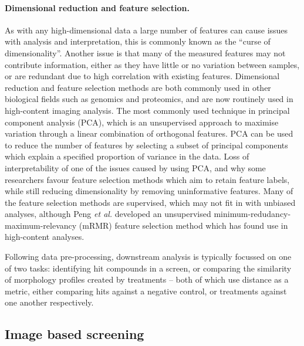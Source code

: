 \documentclass[a4paper,11pt,twoside,openright]{scrbook}
\begin{document}
\paragraph{Dimensional reduction and feature selection.}
As with any high-dimensional data a large number of features can cause issues with analysis and interpretation, this is commonly known as the ``curse of dimensionality''.
Another issue is that many of the measured features may not contribute information, either as they have little or no variation between samples, or are redundant due to high correlation with existing features.
Dimensional reduction and feature selection methods are both commonly used in other biological fields such as genomics and proteomics, and are now routinely used in high-content imaging analysis.
The most commonly used technique in principal component analysis (PCA), which is an unsupervised approach to maximise variation through a linear combination of orthogonal features.
PCA can be used to reduce the number of features by selecting a subset of principal components which explain a specified proportion of variance in the data.
Loss of interpretability of one of the issues caused by using PCA, and why some researchers favour feature selection methods which aim to retain feature labels, while still reducing dimensionality by removing uninformative features.
Many of the feature selection methods are supervised, which may not fit in with unbiased analyses, although Peng \textit{et al.} developed an unsupervised minimum-redudancy-maximum-relevancy (mRMR) feature selection method which has found use in high-content analyses. \cite{Peng2005}
\newline

Following data pre-processing, downstream analysis is typically focussed on one of two tasks: identifying hit compounds in a screen, or comparing the similarity of morphology profiles created by treatments -- both of which use distance as a metric, either comparing hits against a negative control, or treatments against one another respectively.


\subsection{Image based screening}
\end{document}
